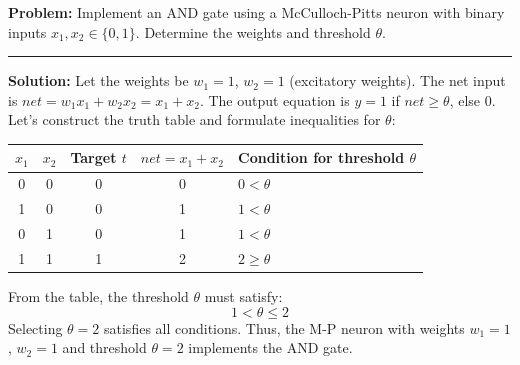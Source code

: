 \documentclass[12pt,a4paper]{article}
\renewcommand{\arraystretch}{1.45}
\begin{document}
\begin{tcolorbox}[examplebox, title={McCulloch-Pitts AND gate Implementation}]
\textbf{Problem:} Implement an AND gate using a McCulloch-Pitts neuron with binary inputs $x_1, x_2 \in \{0, 1\}$. Determine the weights and threshold $\theta$.
\par\vspace{4pt}\noindent\rule{\linewidth}{0.5pt}\par
\textbf{Solution:}
Let the weights be $w_1 = 1$, $w_2 = 1$ (excitatory weights).
The net input is $net = w_1 x_1 + w_2 x_2 = x_1 + x_2$.
The output equation is $y = 1$ if $net \ge \theta$, else $0$.
Let's construct the truth table and formulate inequalities for $\theta$:
\par\vspace{4pt}
\centering
{\renewcommand{\arraystretch}{1.65}%
\begin{tabular}{|c|c|c|c|l|}\hline
$x_1$ & $x_2$ & Target $t$ & $net = x_1 + x_2$ & Condition for threshold $\theta$ \\[4pt]
\hline
0 & 0 & 0 & 0 & $0 < \theta$ \\
\hline
1 & 0 & 0 & 1 & $1 < \theta$ \\
\hline
0 & 1 & 0 & 1 & $1 < \theta$ \\
\hline
1 & 1 & 1 & 2 & $2 \ge \theta$ \\
\hline
\end{tabular}
}
\par\vspace{4pt}\flushleft
From the table, the threshold $\theta$ must satisfy:
\begin{equation*}
  1 < \theta \le 2
\end{equation*}
Selecting $\theta = 2$ satisfies all conditions.
Thus, the M-P neuron with weights $w_1 = 1$, $w_2 = 1$ and threshold $\theta = 2$ implements the AND gate.
\end{tcolorbox}
\end{document}
